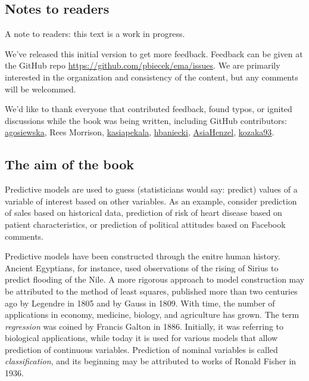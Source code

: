 \documentclass[12pt,]{krantz}
\begin{document}
\hypertarget{notes-to-readers}{%
\subsection{Notes to readers}\label{notes-to-readers}}

A note to readers: this text is a work in progress.

We've released this initial version to get more feedback. Feedback can be given at the GitHub repo \url{https://github.com/pbiecek/ema/issues}. We are primarily interested in the organization and consistency of the content, but any comments will be welcommed.

We'd like to thank everyone that contributed feedback, found typos, or ignited discussions while the book was being written, including GitHub contributors: \href{https://github.com/agosiewska/}{agosiewska}, Rees Morrison, \href{https://github.com/kasiapekala/}{kasiapekala}, \href{https://github.com/hbaniecki/}{hbaniecki}, \href{https://github.com/AsiaHenzel/}{AsiaHenzel}, \href{https://github.com/kozaka93/}{kozaka93}.

\hypertarget{the-aim-of-the-book}{%
\subsection{The aim of the book}\label{the-aim-of-the-book}}

Predictive models are used to guess (statisticians would say: predict) values of a variable of interest based on other variables. As an example, consider prediction of sales based on historical data, prediction of risk of heart disease based on patient characteristics, or prediction of political attitudes based on Facebook comments.

Predictive models have been constructed through the enitre human history. Ancient Egyptians, for instance, used observations of the rising of Sirius to predict flooding of the Nile. A more rigorous approach to model construction may be attributed to the method of least squares, published more than two centuries ago by Legendre in 1805 and by Gauss in 1809. With time, the number of applications in economy, medicine, biology, and agriculture has grown. The term \emph{regression} was coined by Francis Galton in 1886. Initially, it was referring to biological applications, while today it is used for various models that allow prediction of continuous variables. Prediction of nominal variables is called \emph{classification}, and its beginning may be attributed to works of Ronald Fisher in 1936.
\end{document}
